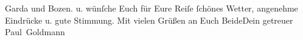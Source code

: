 \begin{ledgroupsized}[t]{13cm}
{{{                     Garda und Bozen.}}}\label{K_L03461-1h} u. wünſche
               Euch für Eure Reiſe ſchönes Wetter, angenehme
               Eindrücke u. gute Stimmung. Mit vielen Grüßen an Euch BeideDein getreuer {\\}\spacefill\mbox{Paul Goldmann}\pend
           
         
         \endnumbering{}\end{ledgroupsized}  \newcommand{\dateiname}{L03461}\newcommand{\titel}{Paul Goldmann an Arthur Schnitzler, 8. 5. 1908}\newcommand{\editorInnen}{Martin Anton Müller und Laura Untner}
      